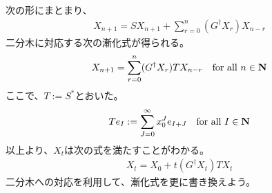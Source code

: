 {	次の形にまとまり、
	\begin{equation*}\begin{split}
		X_{n+1} = SX_{n+1} + \sum_{r=0}^n(G^\dag X_r)X_{n-r}
	\end{split}\end{equation*}
	二分木に対応する次の漸化式が得られる。
	\begin{equation*}\begin{split}
		X_{n+1} = \sum_{r=0}^n(G^\dag X_r)TX_{n-r} 
		\quad\text{for all } n\in\mathbf{N}
	\end{split}\end{equation*}
	ここで、$T:=S^*$とおいた。
	\begin{equation*}\begin{split}
		Te_I := \sum_{J=0}^\infty x_0^Je_{I+J} \quad\text{for all } I\in\mathbf{N}
	\end{split}\end{equation*}
	以上より、$X_t$は次の式を満たすことがわかる。
	\begin{equation}\label{eq:文法の二分木への対応}\begin{split}
		X_t = X_0 + t(G^\dag X_t)TX_t
	\end{split}\end{equation}
	二分木への対応を利用して、漸化式を更に書き換えよう。

}
